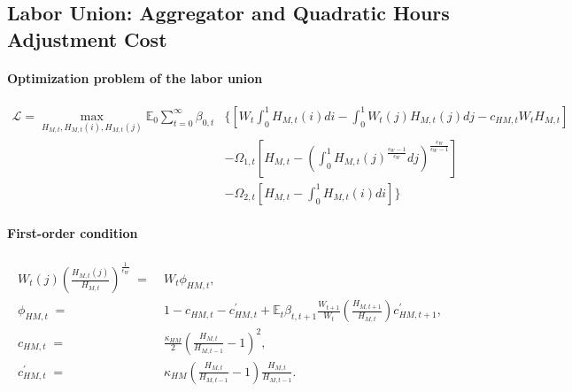 \documentclass[12pt,3p,authoryear,review]{elsarticle}
\begin{document}
\subsection{Labor Union: Aggregator and Quadratic Hours Adjustment Cost}%
\begin{small}%
	\paragraph{Optimization problem of the labor union}%
 	\begin{align*}%
		 \mathcal{L} = \max_{H_{M,t}, H_{M,t}(i), H_{M,t}(j)} \mathbb{E}_0 \sum_{t=0}^{\infty} \beta_{0,t} & \biggl\{ \left[W_t \int_0^1 H_{M,t}(i) di - \int_0^1 W_t(j)H_{M,t}(j) dj - c_{HM,t} W_t H_{M,t} \right]\\%
		 & - \Omega_{1,t} \left[H_{M,t} - \left( \int_0^1 H_{M,t}(j)^{\frac{\epsilon_W-1}{\epsilon_W}} dj \right)^{\frac{\epsilon_W}{\epsilon_W-1}} \right]\\%
		 & - \Omega_{2,t} \left[H_{M,t} - \int_0^1 H_{M,t}(i) di\right] \biggr\}%
 	\end{align*}%
 	\paragraph{First-order condition}%
 	\begin{align}%
		W_t(j) \left(\frac{H_{M,t}(j)}{H_{M,t}}\right)^{\frac{1}{\epsilon_W}} \; = & \; W_t \phi_{HM,t},\\\label{eq:appendix_labor_demand}%
		\phi_{HM,t} \; = & \; 1 - c_{HM,t} - c^{\prime}_{HM,t} + \mathbb{E}_t \beta_{t,t+1} \frac{W_{t+1}}{W_t} \left(\frac{H_{M,t+1}}{H_{M,t}}\right) c^{\prime}_{HM,t+1},\\%
		c_{HM,t} \; = & \; \frac{\kappa_{HM}}{2} \left(\frac{H_{M,t}}{H_{M,t-1}}-1\right)^2,\\%
		c^{\prime}_{HM,t} \; = & \; \kappa_{HM} \left(\frac{H_{M,t}}{H_{M,t-1}}-1\right)\frac{H_{M,t}}{H_{M,t-1}}.%
	\end{align}%
\end{small}%
\pagebreak%
\end{document}
